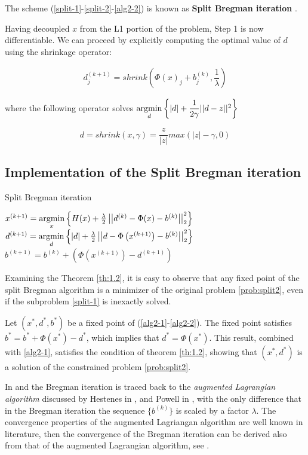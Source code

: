 The scheme (\ref{split-1}-\ref{split-2}-\ref{alg2-2}) is known as \textbf{Split Bregman iteration} \citep{breg_l1}.

Having decoupled $x$ from the L1 portion of the problem, Step 1 is now differentiable. We can proceed by explicitly computing the optimal value of $d$ using the shrinkage operator:

\begin{align*}
d_j^{(k+1)} = shrink\left(\Phi(x)_j + b_j^{(k)}, \dfrac{1}{\lambda}\right)
\end{align*}

where the following operator solves $\mathop{\mathrm{argmin}}\limits_d \left\{|d| + \dfrac{1}{2\gamma}||d-z||^2\right\}$

$$d =  shrink(x,\gamma) = \dfrac{z}{|z|} max(|z|-\gamma,0) $$

\subsection{Implementation of the Split Bregman iteration}

\begin{algorithm}[H]
\caption{Split Bregman iteration}
\begin{algorithmic}
\STATE
\STATE $x^{(k+1)} = \mathop{\mathrm{argmin}}\limits_x \left\{ H(x) + \frac{\lambda}{2} \left|\left|d^{(k)}-\Phi(x) - b^{(k)} \right|\right|_2^2 \right\}$
\STATE
\STATE $d^{(k+1)} = \mathop{\mathrm{argmin}}\limits_d \left\{ |d| + \frac{\lambda}{2}\left|\left|d-\Phi\left(x^{(k+1)}\right)-b^{(k)}\right|\right|_2^2 \right\}$
\STATE
\STATE $b^{(k+1)} = b^{(k)}+\left(\Phi\left(x^{(k+1)}\right)-d^{(k+1)}\right)$
\STATE
\ENDWHILE
\end{algorithmic}
\end{algorithm}

Examining the Theorem \ref{th:1.2}, it is easy to observe that any fixed point of the split Bregman algorithm is a minimizer of the original problem \eqref{prob:split2}, even if the subproblem  \eqref{split-1} is inexactly solved.

Let $(x^*,d^*,b^*)$ be a fixed point of (\ref{alg2-1}-\ref{alg2-2}). The fixed point satisfies $b^* = b^* + \Phi(x^*) - d^*$, which implies that $d^* = \Phi (x^*)$. This result, combined with \eqref{alg2-1}, satisfies the condition of theorem \ref{th:1.2}, showing that $(x^*,d^*)$ is a solution of the constrained problem \eqref{prob:split2}.

In \citep{deblurring} and \citep{operator} the Bregman iteration is traced back to the \emph{augmented Lagrangian algorithm} discussed by Hestenes in \citep{hestenes}, and Powell in \citep{powell}, with the only difference that in the Bregman iteration the sequence $\{b^{(k)}\}$ is scaled by a factor $\lambda$. The convergence properties of the augmented Lagriangan algorithm are well known in literature, then the convergence of the Bregman iteration can be derived also from that of the augmented Lagrangian algorithm, see \citep{bertsekas}.


